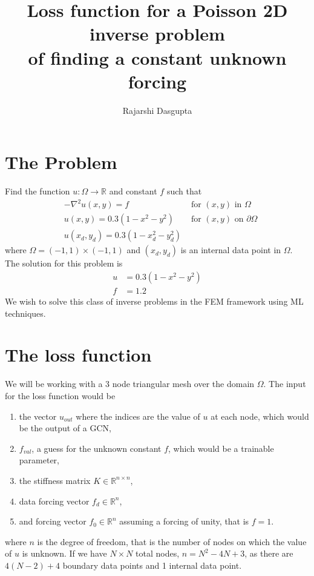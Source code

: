 \documentclass{article}
\title{
	Loss function for a Poisson 2D inverse problem \\
	of finding a constant unknown forcing
	}
\author{Rajarshi Dasgupta}
\begin{document}
\maketitle

\section{The Problem}

Find the function $u: \Omega \rightarrow \mathbb{R}$
and constant $f$ such that
\begin{align*}
	& - \nabla^2 u(x,y) = f & \mbox{ for } (x,y) \mbox{ in } \Omega \\
	& u(x,y) = 0.3(1 - x^2 - y^2) & \mbox{ for } (x,y) \mbox{ on } \partial \Omega \\
	& u(x_d,y_d) = 0.3(1 - x_d^2 - y_d^2)
\end{align*}
where $\Omega = (-1,1) \times (-1,1)$
and $(x_d,y_d)$ is an internal data point in $\Omega$.
The solution for this problem is
\begin{align*}
	u & = 0.3(1 - x^2 - y^2) \\
	f &= 1.2
\end{align*}
We wish to solve this class of inverse problems
in the FEM framework using ML techniques.

\section{The loss function}

We will be working with a 3 node triangular mesh
over the domain $\Omega$.
The input for the loss function would be
\begin{enumerate}
	\item the vector $u_{\mathit{out}}$
		where the indices are the value of $u$ at each node,
		which would be the output of a GCN,
	\item $f_{\mathit{val}}$, a guess for the unknown constant $f$,
		which would be a trainable parameter,
	\item the stiffness matrix $K \in \mathbb{R}^{n \times n}$,
	\item data forcing vector $f_d \in \mathbb{R}^n$,
	\item and forcing vector $f_0 \in \mathbb{R}^n$
		assuming a forcing of unity,
		that is $f=1$.
\end{enumerate}
where $n$ is the degree of freedom,
that is the number of nodes
on which the value of $u$ is unknown.
If we have $N \times N$ total nodes,
$n = N^2 - 4N + 3$,
as there are $4(N-2) + 4$ boundary data points
and 1 internal data point.
\end{document}
